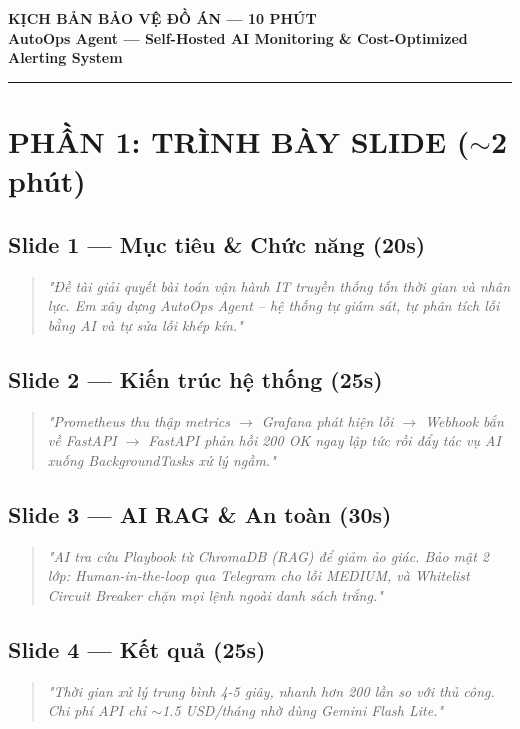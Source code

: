 \documentclass[12pt,a4paper]{article}
\begin{document}
\begin{center}
    \LARGE \textbf{KỊCH BẢN BẢO VỆ ĐỒ ÁN — 10 PHÚT} \\
    \vspace{0.5cm}
    \large \textbf{AutoOps Agent — Self-Hosted AI Monitoring \& Cost-Optimized Alerting System} \\
    \vspace{0.5cm}
    \rule{\linewidth}{0.5mm}
\end{center}

\section{PHẦN 1: TRÌNH BÀY SLIDE ($\sim$2 phút)}

\subsection{Slide 1 — Mục tiêu \& Chức năng (20s)}
\begin{quote}
    \textit{"Đề tài giải quyết bài toán vận hành IT truyền thống tốn thời gian và nhân lực. Em xây dựng AutoOps Agent – hệ thống tự giám sát, tự phân tích lỗi bằng AI và tự sửa lỗi khép kín."}
\end{quote}

\subsection{Slide 2 — Kiến trúc hệ thống (25s)}
\begin{quote}
    \textit{"Prometheus thu thập metrics $\rightarrow$ Grafana phát hiện lỗi $\rightarrow$ Webhook bắn về FastAPI $\rightarrow$ FastAPI phản hồi 200 OK ngay lập tức rồi đẩy tác vụ AI xuống BackgroundTasks xử lý ngầm."}
\end{quote}

\subsection{Slide 3 — AI RAG \& An toàn (30s)}
\begin{quote}
    \textit{"AI tra cứu Playbook từ ChromaDB (RAG) để giảm ảo giác. Bảo mật 2 lớp: Human-in-the-loop qua Telegram cho lỗi MEDIUM, và Whitelist Circuit Breaker chặn mọi lệnh ngoài danh sách trắng."}
\end{quote}

\subsection{Slide 4 — Kết quả (25s)}
\begin{quote}
    \textit{"Thời gian xử lý trung bình 4-5 giây, nhanh hơn 200 lần so với thủ công. Chi phí API chỉ $\sim$1.5 USD/tháng nhờ dùng Gemini Flash Lite."}
\end{quote}
\end{document}
